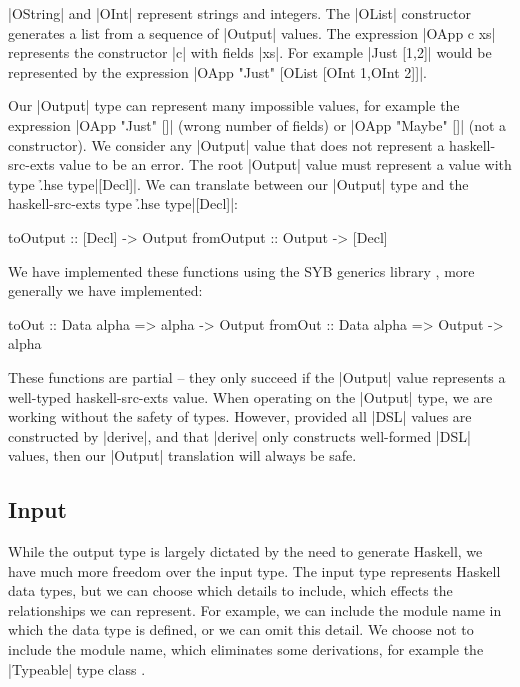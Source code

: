 \documentclass[preprint,draft]{sigplanconf}
\begin{document}
\noindent|OString| and |OInt| represent strings and integers. The |OList| constructor generates a list from a sequence of |Output| values. The expression |OApp c xs| represents the constructor |c| with fields |xs|. For example |Just [1,2]| would be represented by the expression |OApp "Just" [OList [OInt 1,OInt 2]]|.

Our |Output| type can represent many impossible values, for example the expression |OApp "Just" []| (wrong number of fields) or |OApp "Maybe" []| (not a constructor). We consider any |Output| value that does not represent a haskell-src-exts value to be an error. The root |Output| value must represent a value with type \h{.hse type}|[Decl]|. We can translate between our |Output| type and the haskell-src-exts type \h{.hse type}|[Decl]|:

\begin{code}
toOutput    :: [Decl] -> Output
fromOutput  :: Output -> [Decl]
\end{code}

We have implemented these functions using the SYB generics library \cite{lammel:syb2}, more generally we have implemented:

\begin{code}
toOut    :: Data alpha => alpha -> Output
fromOut  :: Data alpha => Output -> alpha
\end{code}

These functions are partial -- they only succeed if the |Output| value represents a well-typed haskell-src-exts value. When operating on the |Output| type, we are working without the safety of types. However, provided all |DSL| values are constructed by |derive|, and that |derive| only constructs well-formed |DSL| values, then our |Output| translation will always be safe.

\subsection{Input}

While the output type is largely dictated by the need to generate Haskell, we have much more freedom over the input type. The input type represents Haskell data types, but we can choose which details to include, which effects the relationships we can represent. For example, we can include the module name in which the data type is defined, or we can omit this detail. We choose not to include the module name, which eliminates some derivations, for example the |Typeable| type class \cite{lammel:syb}.
\end{document}
